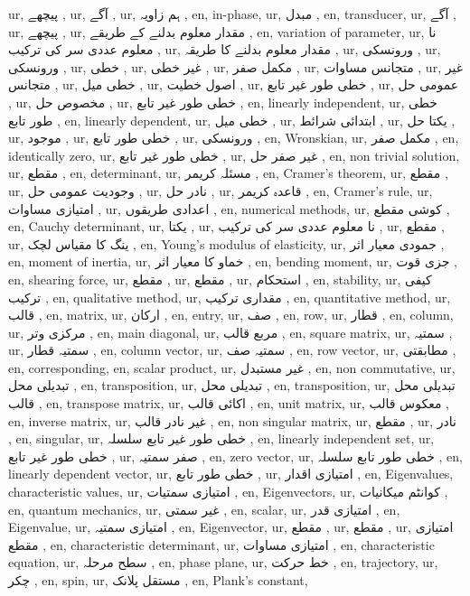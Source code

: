 ur, پیچھے ,
ur, آگے ,
ur, ہم زاویہ ,
en, in-phase,
ur, مبدل ,
en, transducer,
ur, آگے ,
ur, پیچھے ,
ur, مقدار معلوم بدلنے کے طریقے ,
en, variation of parameter,
ur, نا معلوم عددی سر کی ترکیب ,
ur, مقدار معلوم بدلنے کا طریقہ ,
ur, ورونسکی ,
ur, ورونسکی ,
ur, خطی ,
ur, غیر خطی ,
ur, مکمل صفر ,
ur, متجانس مساوات ,
ur, غیر متجانس ,
ur, خطی میل ,
ur, اصول خطیت ,
ur, خطی طور غیر تابع ,
ur, عمومی حل ,
ur, مخصوص حل ,
ur, خطی طور غیر تابع ,
en, linearly independent,
ur, خطی طور تابع ,
en, linearly dependent,
ur, خطی میل ,
ur, ابتدائی شرائط ,
ur, یکتا حل ,
ur, موجود ,
ur, خطی طور تابع ,
ur, ورونسکی ,
en, Wronskian,
ur, مکمل صفر ,
en, identically zero,
ur, خطی طور غیر تابع ,
ur, غیر صفر حل ,
en, non trivial solution,
ur, مقطع ,
en, determinant,
ur, مسئلہ کریمر ,
en, Cramer's theorem,
ur, مقطع ,
ur, وجودیت عمومی حل ,
ur, نادر حل ,
ur, قاعدہ کریمر ,
en, Cramer's rule,
ur, امتیازی مساوات ,
ur, اعدادی طریقوں ,
en, numerical methods,
ur, کوشی مقطع ,
en, Cauchy determinant,
ur, یکتا ,
ur, نا معلوم عددی سر کی ترکیب ,
ur, مقطع ,
ur, ینگ کا مقیاس لچک ,
en, Young's modulus of elasticity,
ur, جمودی معیار اثر ,
en, moment of inertia,
ur, خماو کا معیار اثر ,
en, bending moment,
ur, جزی قوت ,
en, shearing force,
ur, مقطع ,
ur, مقطع ,
ur, استحکام ,
en, stability,
ur, کیفی ترکیب ,
en, qualitative method,
ur, مقداری ترکیب ,
en, quantitative method,
ur, قالب ,
en, matrix,
ur, ارکان ,
en, entry,
ur, صف ,
en, row,
ur, قطار ,
en, column,
ur, مرکزی وتر ,
en, main diagonal,
ur, مربع قالب ,
en, square matrix,
ur, سمتیہ ,
ur, سمتیہ قطار ,
en, column vector,
ur, سمتیہ صف ,
en, row vector,
ur, مطابقتی ,
en, corresponding,
en, scalar product,
ur, غیر مستبدل ,
en, non commutative,
ur, تبدیلی محل ,
en, transposition,
ur, تبدیلی محل ,
en, transposition,
ur, تبدیلی محل قالب ,
en, transpose matrix,
ur, اکائی قالب ,
en, unit matrix,
ur, معکوس قالب ,
en, inverse matrix,
ur, غیر نادر قالب ,
en, non singular matrix,
ur, مقطع ,
ur, نادر ,
en, singular,
ur, خطی طور غیر تابع سلسلہ ,
en, linearly independent set,
ur, خطی طور غیر تابع ,
ur, صفر سمتیہ ,
en, zero vector,
ur, خطی طور تابع سلسلہ ,
en, linearly dependent vector,
ur, خطی طور تابع ,
ur, امتیازی اقدار ,
en, Eigenvalues, characteristic values,
ur, امتیازی سمتیات ,
en, Eigenvectors,
ur, کوانٹم میکانیات ,
en, quantum mechanics,
ur, غیر سمتی ,
en, scalar,
ur, امتیازی قدر ,
en, Eigenvalue,
ur, امتیازی سمتیہ ,
en, Eigenvector,
ur, مقطع ,
ur, مقطع ,
ur, امتیازی مقطع ,
en, characteristic determinant,
ur, امتیازی مساوات ,
en, characteristic equation,
ur, سطح مرحلہ ,
en, phase plane,
ur, خط حرکت ,
en, trajectory,
ur, چکر ,
en, spin,
ur, مستقل پلانک ,
en, Plank's constant,
